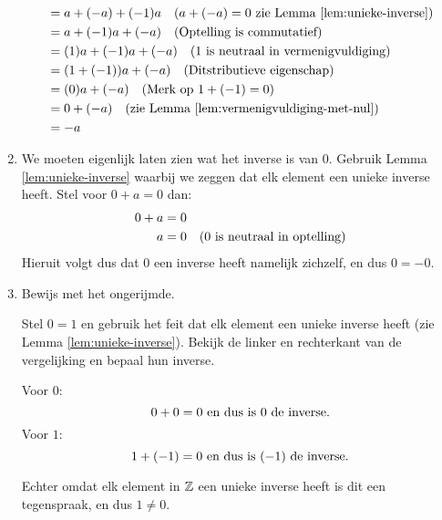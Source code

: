 \documentclass{article}
\begin{document}
\begin{enumerate}[label=\alph*)]
\begin{align*}
                    & = a + (-a) + (-1)a \quad (a + (-a) = 0 \ \tx{zie Lemma \ref{lem:unieke-inverse}}) \\
                    & = a + (-1)a + (-a) \quad (\tx{Optelling is commutatief})                          \\
                    & = (1)a + (-1)a + (-a) \quad (1 \tx{ is neutraal in vermenigvuldiging})            \\
                    & = (1 + (-1))a + (-a) \quad (\tx{Ditstributieve eigenschap})                       \\
                    & = (0)a + (-a) \quad (\tx{Merk op }1 + (-1) = 0)                                   \\
                    & = 0 + (-a)     \quad (\tx{zie Lemma \ref{lem:vermenigvuldiging-met-nul}})         \\
                    & = -a
          \end{align*}

    \item
          We moeten eigenlijk laten zien wat het inverse is van $0$.
          Gebruik Lemma \ref{lem:unieke-inverse} waarbij we zeggen dat elk element een unieke inverse heeft.
          Stel voor $0 + a = 0$ dan:
          \begin{align*}
              0 + a & = 0                                          \\
              a     & = 0 \quad (0 \text{ is neutraal in optelling}) \\
          \end{align*}
          Hieruit volgt dus dat $0$ een inverse heeft namelijk zichzelf, en dus $0 = -0$.
    \item
          Bewijs met het ongerijmde.

          Stel $0 = 1$ en gebruik het feit dat elk element
          een unieke inverse heeft (zie Lemma \ref{lem:unieke-inverse}). Bekijk de linker en rechterkant van de vergelijking en bepaal hun inverse.

          Voor $0$:
          \[0 + 0 = 0 \text{ en dus is } 0 \text{ de inverse.}\]
          Voor $1$:
          \[1 + (-1) = 0 \text{ en dus is } (-1) \text{ de inverse.}\]

          Echter omdat elk element in $\mathbb{Z}$ een unieke inverse heeft is dit een tegenspraak,
          en dus $1 \neq 0$.
\end{enumerate}

\pagebreak
\end{document}

